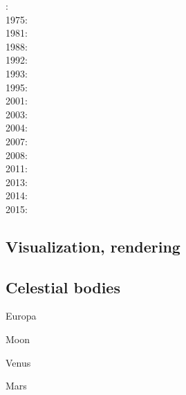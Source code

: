 : \cite{bers72}\\
1975: \cite{dixo75}\\
1981: \cite{brpo81}\\
1988: \cite{sccm88}\\
1992: \cite{vayv92}\cite{zaju92}\cite{wein92}\cite{wesc92}\cite{veja92}\\
1993: \cite{kesb93}\cite{nabr93}\cite{potp93}\cite{povp93}\cite{vasv93}\cite{pocp93}\cite{popt93}\cite{wein93}\\
1995: \cite{wepo95}\cite{bisc95}\cite{wepo95}\\
2001: \cite{kapo01}\\
2003: \cite{geur03}\cite{vavs03}\\
2004: \cite{gepm04}\cite{istt04}\cite{geur04}\\
2007: \cite{gebu07}\\
2008: \cite{buge08}\cite{zlfd08}\cite{mohc98}\\
2011: \cite{ellw11}\cite{pege11}\\
2013: \cite{fusc13}\\
2014: \cite{feka14b}\\
2015: \cite{feka15}\cite{fuks15}


\subsection*{Visualization, rendering}

\cite{faha}
\cite{chzy08}
\cite{stmt08}
\cite{cram18}

\subsection*{Celestial bodies}

Europa \cite{shha04,shha05,mish05,hash08}\cite{hash10}\cite{hash11,almc19}

Moon \cite{elvh02}\cite{elhg04}\cite{devv10} \cite{zhdv19} 

Venus \cite{scbg90,lekb91,kiha92,sqjs92,kief93,lekb93,lekb95,somo96,mazk98}\cite{moso98}\cite{phha98}
\cite{vavv05}\cite{stfh10}\cite{orso11,arta12}\cite{gita14}\cite{gery14b}\cite{cram17}\cite{dast17}\cite{king18}

Mars \cite{scbg90}\cite{hach96}\cite{nist01}\cite{lenm04}\cite{vavv05}\cite{losh06,loha08}
\cite{keta09,zhon09}
\cite{srzh10,srzh12}\cite{gokg11}
\cite{ruts13}\cite{seki14}\cite{zhon16}

